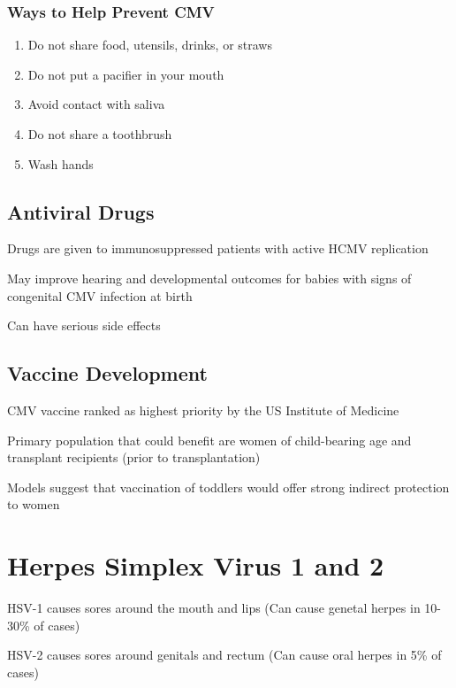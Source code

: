 \documentclass{notes}
\begin{document}
\subsubsection{Ways to Help Prevent CMV}

\begin{enumerate}
    \item Do not share food, utensils, drinks, or straws
    \item Do not put a pacifier in your mouth
    \item Avoid contact with saliva
    \item Do not share a toothbrush
    \item Wash hands
\end{enumerate}

\subsection{Antiviral Drugs}


Drugs are given to immunosuppressed patients with active HCMV replication

\tab May improve hearing and developmental outcomes for babies with signs of congenital CMV infection at birth

\tab Can have serious side effects

\subsection{Vaccine Development}

CMV vaccine ranked as highest priority by the US Institute of Medicine

Primary population that could benefit are women of child-bearing age and transplant recipients (prior to transplantation)

\tab Models suggest that vaccination of toddlers would offer strong indirect protection to women

\section{Herpes Simplex Virus 1 and 2}

HSV-1 causes sores around the mouth and lips (Can cause genetal herpes in 10-30\% of cases)

HSV-2 causes sores around genitals and rectum (Can cause oral herpes in 5\% of cases)
\end{document}
